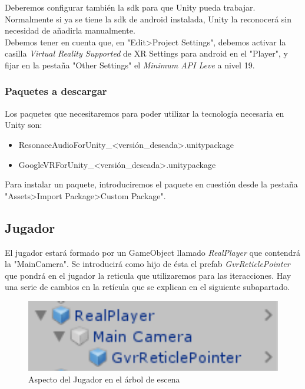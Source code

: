 \quad Deberemos configurar también la sdk para que Unity pueda trabajar. Normalmente si ya se tiene la sdk de android instalada, Unity la reconocerá sin necesidad de añadirla manualmente.\\

\quad Debemos tener en cuenta que, en "Edit>Project Settings", debemos activar la casilla \textit{Virtual Reality Supported} de XR Settings para android en el "Player", y fijar en la pestaña "Other Settings" el \textit{Minimum API Leve} a nivel 19.\\

\subsubsection{Paquetes a descargar}

\quad Los paquetes que necesitaremos para poder utilizar la tecnología necesaria en Unity son:\\

\begin{itemize}
	\item ResonaceAudioForUnity\_<versión\_deseada>.unitypackage
	\item GoogleVRForUnity\_<versión\_deseada>.unitypackage
\end{itemize}

\quad Para instalar un paquete, introduciremos el paquete en cuestión desde la pestaña "Assets>Import Package>Custom Package".\\

\subsection{Jugador}

\quad El jugador estará formado por un GameObject llamado \textit{RealPlayer} que contendrá la "MainCamera". Se introducirá como hijo de ésta el prefab \textit{GvrReticlePointer} que pondrá en el jugador la reticula que utilizaremos para las iteracciones. Hay una serie de cambios en la retícula que se explican en el siguiente subapartado.\\

\begin{figure}[htb]
	\centering
	\includegraphics[width=1\textwidth]{./imagenes/player}
	\caption{Aspecto del Jugador en el árbol de escena}
\end{figure} 

